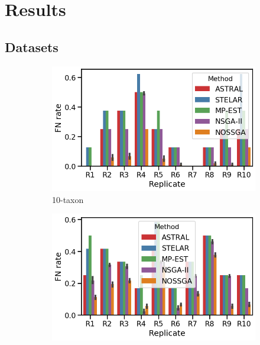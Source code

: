 \section{Results}
\subsection{Datasets}
\begin{figure}[!htbp]
	\centering
	\begin{adjustwidth}{-4.5cm}{}
	\begin{subfigure}[b]{0.5\textwidth}
		\includegraphics[width=\textwidth]{Figure/10-taxon_10_replicates}
		\caption{10-taxon}
	\end{subfigure}%
	\begin{subfigure}[b]{0.5\textwidth}
		\includegraphics[width=\textwidth]{Figure/15-taxon_10_replicates}

\end{subfigure}
\end{adjustwidth}
\end{figure}
